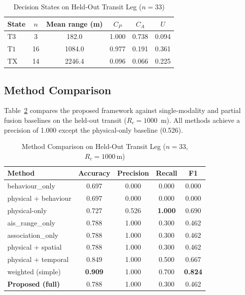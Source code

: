 \documentclass[conference]{IEEEtran}
\newcommand{\dstate}[1]{\ensuremath{\mathrm{#1}}}
\begin{document}
\begin{table}[!t]
\caption{Decision States on Held-Out Transit Leg ($n=33$)}
\label{tab:states}
\centering
\footnotesize
\begin{tabular}{@{}lccccc@{}}
\toprule
State & $n$ & Mean range (m) & $C_P$ & $C_A$ & $U$ \\
\midrule
\dstate{T3} & 3 & 182.0 & 1.000 & 0.738 & 0.094 \\
\dstate{T1} & 16 & 1084.0 & 0.977 & 0.191 & 0.361 \\
\dstate{TX} & 14 & 2246.4 & 0.096 & 0.066 & 0.225 \\
\bottomrule
\end{tabular}
\end{table}

\subsection{Method Comparison}
Table~\ref{tab:methods} compares the proposed framework against single-modality and partial fusion baselines on the held-out transit ($R_c = 1000$~m). All methods achieve a precision of 1.000 except the physical-only baseline (0.526).

\begin{table}[!t]
\caption{Method Comparison on Held-Out Transit Leg ($n=33$, $R_c=1000\,\mathrm{m}$)}
\label{tab:methods}
\centering
\footnotesize
\begin{tabular}{@{}lcccc@{}}
\toprule
Method & Accuracy & Precision & Recall & F1 \\
\midrule
behaviour\_only & 0.697 & 0.000 & 0.000 & 0.000 \\
physical + behaviour & 0.697 & 0.000 & 0.000 & 0.000 \\
physical-only & 0.727 & 0.526 & \textbf{1.000} & 0.690 \\
ais\_range\_only & 0.788 & 1.000 & 0.300 & 0.462 \\
association\_only & 0.788 & 1.000 & 0.300 & 0.462 \\
physical + spatial & 0.788 & 1.000 & 0.300 & 0.462 \\
physical + temporal & 0.849 & 1.000 & 0.500 & 0.667 \\
weighted (simple) & \textbf{0.909} & 1.000 & 0.700 & \textbf{0.824} \\
\textbf{Proposed (full)} & 0.788 & 1.000 & 0.300 & 0.462 \\
\bottomrule
\end{tabular}
\end{table}
\end{document}
